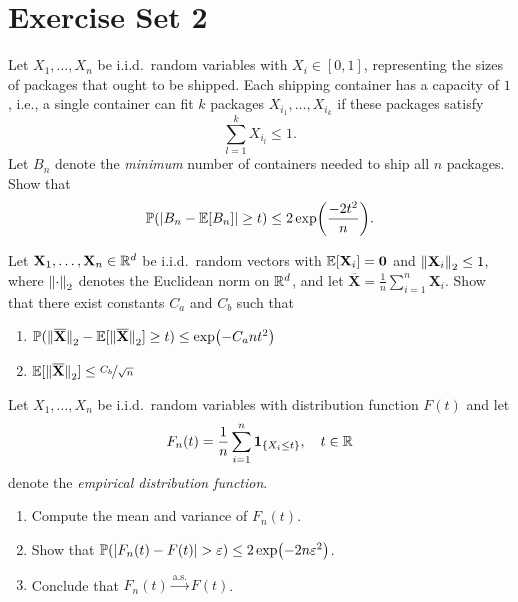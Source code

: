 \section{Exercise Set 2}

\begin{exercise}
Let $X_1, \dots, X_n$ be i.i.d.\ random variables with $X_i \in [0,1]$, representing the sizes of packages that ought to be shipped. Each shipping container has a capacity of $1$, i.e., a single container can fit $k$ packages $X_{i_1}, \dots, X_{i_k}$ if these packages satisfy
\[
    \sum_{l=1}^k X_{i_l} \leq 1.
\]
Let $B_n$ denote the \emph{minimum} number of containers needed to ship all $n$ packages. Show that
\[
    \operatorname{\mathbb{P}}(\abs{B_n - \operatorname{\mathbb{E}}[B_n]} \geq t) \leq 2 \exp(\frac{-2t^2}{n}).
\]
\end{exercise}


\begin{exercise}
Let $\mathbf{X}_1, \dots, \mathbf{X}_n \in \mathbb{R}^d$ be i.i.d.\ random vectors with $\operatorname{\mathbb{E}}[\mathbf{X}_i] = \mathbf{0}$ and $\norm{\mathbf{X}_i}_2 \leq 1$, where $\norm{\cdot}_2$ denotes the Euclidean norm on $\mathbb{R}^d$, and let $\overline{\mathbf{X}} = \frac{1}{n} \sum_{i=1}^n \mathbf{X}_i$. Show that there exist constants $C_a$ and $C_b$ such that
\begin{enumerate}
    \item $\Prob(\norm*{\overline{\mathbf{X}}}_2 - \Exp[\norm*{\overline{\mathbf{X}}}_2] \geq t) \leq \exp(-C_a n t^2)$

    \item $\Exp[\norm*{\overline{\mathbf{X}}}_2] \leq \nicefrac{C_b}{\sqrt{n}}$
\end{enumerate}
\end{exercise}


\begin{exercise}
Let $X_1, \dots, X_n$ be i.i.d.\ random variables with distribution function $F(t)$ and let
\[
    F_n(t) = \frac{1}{n} \sum_{i=1}^n \indSet{X_i \leq t}, \quad t \in \R
\]
denote the \emph{empirical distribution function}.
\begin{enumerate}
    \item Compute the mean and variance of $F_n(t)$.

    \item Show that $\operatorname{\mathbb{P}}(\abs{F_n(t) - F(t)} > \varepsilon) \leq 2 \exp(-2 n \varepsilon^2)$.

    \item Conclude that $F_n(t) \xrightarrow{\mathrm{a.s.}} F(t)$.
\end{enumerate}
\end{exercise}
